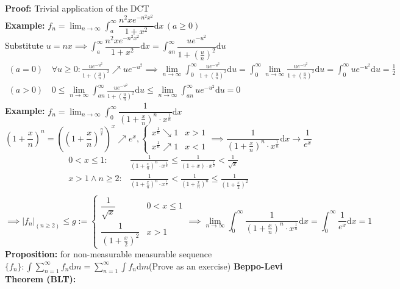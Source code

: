\documentclass{article}
\newcommand{\sumninf}{\displaystyle\sum_{n=1}^\infty}
\newcommand{\limninf}{\displaystyle\lim_{n\to\infty}}
\newcommand{\0}{{\bf{0}}}
\newcommand{\1}{{\bf{1}}}
\newcommand{\dint}{\displaystyle\int}
\newcommand{\dif}{\mbox{d}}
\newcommand{\incto}{\nearrow}
\newcommand{\decto}{\searrow}
\begin{document}
\textbf{Proof:} Trivial application of the DCT\\
\textbf{Example:} $f_n=\limninf\dint_a^\infty\dfrac{n^2xe^{-n^2x^2}}{1+x^2}\dif x\,(a\geq0)$\\
Substitute $u=nx\implies\dint_a^\infty\dfrac{n^2xe^{-n^2x^2}}{1+x^2}\dif x=\dint_{an}^\infty\dfrac{ue^{-u^2}}{1+(\frac{u}{n})^2}\dif u$
\begin{equation}
\begin{split}
    (a=0)\,&\forall u\geq0:\frac{ue^{-u^2}}{1+(\frac{u}{n})^2}\incto ue^{-u^2}\implies\limninf\int_0^\infty\frac{ue^{-u^2}}{1+(\frac{u}{n})^2}\dif u=\dint_0^\infty\limninf\frac{ue^{-u^2}}{1+(\frac{u}{n})^2}\dif u=\int_0^\infty ue^{-u^2}\dif u=\frac{1}{2}\\
    (a>0)\,&0\le\limninf\int_{an}^\infty\frac{ue^{-u^2}}{1+(\frac{u}{n})^2}\dif u\le\limninf\int_{an}^\infty ue^{-u^2}\dif u=0
\end{split}
\end{equation}
\textbf{Example:} $f_n=\limninf\dint_0^\infty\dfrac{1}{(1+\frac{x}{n})^n\cdot x^{\frac{1}{n}}}\dif x$
$$\left(1+\frac{x}{n}\right)^n=\left(\left(1+\frac{x}{n}\right)^{\frac{n}{x}}\right)^x\incto e^x,\begin{cases}
    x^{\frac{1}{n}}\decto1&x>1\\
    x^{\frac{1}{n}}\incto1&x<1
\end{cases}\implies\dfrac{1}{(1+\frac{x}{n})^n\cdot x^{\frac{1}{n}}}\dif x\to\dfrac{1}{e^x}$$
\begin{equation}
\begin{split}
    0<x\le1:&\frac{1}{(1+\frac{x}{n})^n\cdot x^{\frac{1}{n}}}\le\frac{1}{(1+x)\cdot x^{\frac{1}{2}}}<\frac{1}{\sqrt{x}}\\
    x>1\land n\geq2:&\frac{1}{(1+\frac{x}{n})^n\cdot x^{\frac{1}{n}}}<\frac{1}{(1+\frac{x}{n})^n}\le\frac{1}{(1+\frac{x}{2})^2}\\
\end{split}
\end{equation}
$$\implies|f_n|_{(n\geq2)}\le g:=\begin{cases}
    \dfrac{1}{\sqrt{x}}&0<x\le1\\
    \dfrac{1}{(1+\frac{x}{2})^2}&x>1
\end{cases}\implies\limninf\int_0^\infty\dfrac{1}{(1+\frac{x}{n})^n\cdot x^{\frac{1}{n}}}\dif x=\int_0^\infty\frac{1}{e^x}\dif x=1$$
\textbf{Proposition:} for non-measurable measurable sequence $\{f_n\}:\dint\sumninf f_n\dif m=\sumninf\dint f_n\dif m$\null\hfill{(Prove as an exercise)}
\textbf{Beppo-Levi Theorem (BLT):}\\
\end{document}
